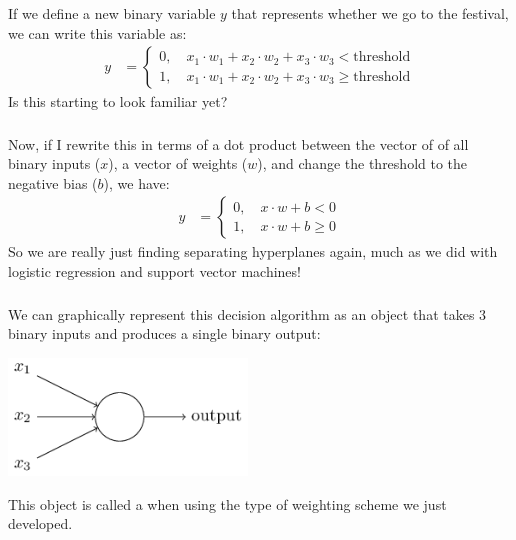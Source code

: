 \documentclass[xetex,mathserif,serif,aspectratio=169]{beamer}
\begin{document}
\begin{frame}[fragile] \frametitle{} \oldB \small


If we define a new binary variable $y$ that represents whether we go to
the festival, we can write this variable as:
\begin{align*}
y &= \left\{ \begin{array}{c} 0, \quad x_1 \cdot w_1 + x_2 \cdot w_2 + x_3 \cdot w_3 < \text{threshold} \\
                              1, \quad x_1 \cdot w_1 + x_2 \cdot w_2 + x_3 \cdot w_3 \geq \text{threshold}
              \end{array} \right.
\end{align*}
Is this starting to look familiar yet?

\end{frame}

\begin{frame}[fragile] \frametitle{} \oldB \small


Now, if I rewrite this in terms of a dot product between the vector of
of all binary inputs ($x$), a vector of weights ($w$), and change the
threshold to the negative bias ($b$), we have:
\begin{align*}
y &= \left\{ \begin{array}{c} 0, \quad x \cdot w + b < 0 \\
                              1, \quad x \cdot w + b \geq 0
              \end{array} \right.
\end{align*}
So we are really just finding separating hyperplanes again, much as we
did with logistic regression and support vector machines!

\end{frame}

\begin{frame}[fragile] \frametitle{} \oldB \small


We can graphically represent this decision algorithm as an object that
takes $3$ binary inputs and produces a single binary output:
\begin{center}
\includegraphics[width=2.5in]{img/tikz0.png}
\end{center}
This object is called a  when using the type of weighting
scheme we just developed.

\end{frame}
\end{document}
